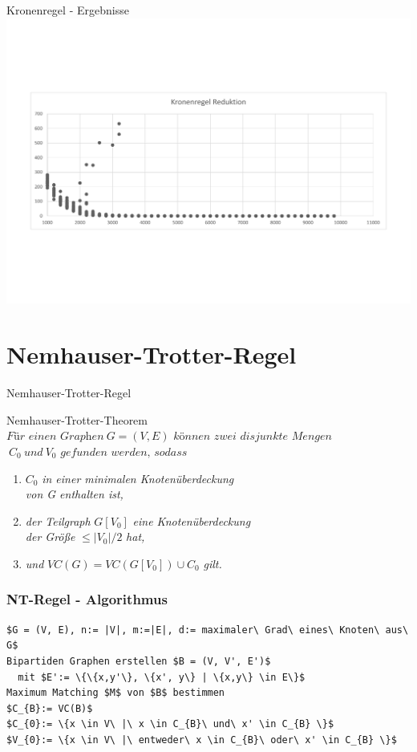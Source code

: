 \documentclass{beamer}
\begin{document}
\begin{frame}{Kronenregel - Ergebnisse}
\includegraphics[scale= .4]{analysisCrown.pdf} 
\end{frame}

\section{Nemhauser-Trotter-Regel}
	
\begin{frame}{Nemhauser-Trotter-Regel}
\begin{block}{Nemhauser-Trotter-Theorem}
$\textit{Für einen Graphen}\ G=(V,E)\textit{ können zwei disjunkte Mengen}$\\ $\ C_{0}\ und\ V_{0} \textit{ gefunden werden, sodass}$ 
\begin{enumerate}
\item $C_{0}$ \textit{ in einer minimalen Knotenüberdeckung} \\
\textit{von G enthalten ist,} 
\item \textit{der Teilgraph }$G[V_{0}]$ \textit{eine Knotenüberdeckung}\\
\textit{der Größe} $\leq |V_{0}| / 2$ \textit{ hat,} 
\item \textit{und} $VC(G) = VC(G[V_{0}])\cup C_{0}$ \textit{ gilt.}
\end{enumerate}

\end{block}
\end{frame}
	
\begin{frame}[fragile]
\frametitle{NT-Regel - Algorithmus}
\begin{lstlisting}[mathescape = true, basicstyle=\ttfamily, escapechar = !]
$G = (V, E), n:= |V|, m:=|E|, d:= maximaler\ Grad\ eines\ Knoten\ aus\ G$
Bipartiden Graphen erstellen $B = (V, V', E')$
  mit $E':= \{\{x,y'\}, \{x', y\} | \{x,y\} \in E\}$
Maximum Matching $M$ von $B$ bestimmen
$C_{B}:= VC(B)$
$C_{0}:= \{x \in V\ |\ x \in C_{B}\ und\ x' \in C_{B} \}$
$V_{0}:= \{x \in V\ |\ entweder\ x \in C_{B}\ oder\ x' \in C_{B} \}$
\end{lstlisting}

\end{frame}
\end{document}
